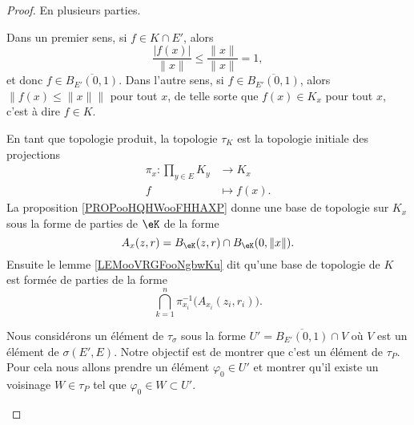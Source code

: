 \begin{proof}
	En plusieurs parties.
	\begin{subproof}
		\spitem[\( K\cap E'=\overline{B_{E'}(0,1)}\)]
		Dans un premier sens, si \( f\in K\cap E'\), alors
		\begin{equation}
			\frac{ | f(x) | }{ \| x \| }\leq \frac{ \| x \| }{ \| x \| }=1,
		\end{equation}
		et donc \( f\in \overline{B_{E'}(0,1)}\). Dans l'autre sens, si \( f\in\overline{B_{E'}(0,1)}\), alors \( \| f(x)\leq \| x \| \|\) pour tout \( x\), de telle sorte que \( f(x)\in K_x\) pour tout \( x\), c'est à dire \( f\in K\).

				\label{SPITEMooTIKWooTQzsGk}
		En tant que topologie produit, la topologie \( \tau_K\) est la topologie initiale des projections
		\begin{equation}
			\begin{aligned}
				\pi_x\colon \prod_{y\in E}K_y & \to K_x       \\
				f                             & \mapsto f(x).
			\end{aligned}
		\end{equation}
		La proposition \ref{PROPooHQHWooFHHAXP} donne une base de topologie sur \( K_x\) sous la forme de parties de \( \eK\) de la forme
		\begin{equation}
			A_x(z,r)=B_{\eK}(z,r)\cap B_{\eK}(0,\| x \|).
		\end{equation}
		Ensuite le lemme \ref{LEMooVRGFooNgbwKu} dit qu'une base de topologie de \( K\) est formée de parties de la forme
		\begin{equation}
			\bigcap_{k=1}^n\pi_{x_i}^{-1}\big( A_{x_i}(z_i,r_i) \big).
		\end{equation}

		Nous considérons un élément de \( \tau_{\sigma}\) sous la forme \( U'=\overline{B_{E'}(0,1)}\cap V\) où \( V\) est un élément de \( \sigma(E',E)\). Notre objectif est de montrer que c'est un élément de \( \tau_P\). Pour cela nous allons prendre un élément \( \varphi_0\in U'\) et montrer qu'il existe un voisinage \( W\in \tau_P\) tel que \( \varphi_0\in W\subset U'\).


\end{subproof}
\end{proof}
